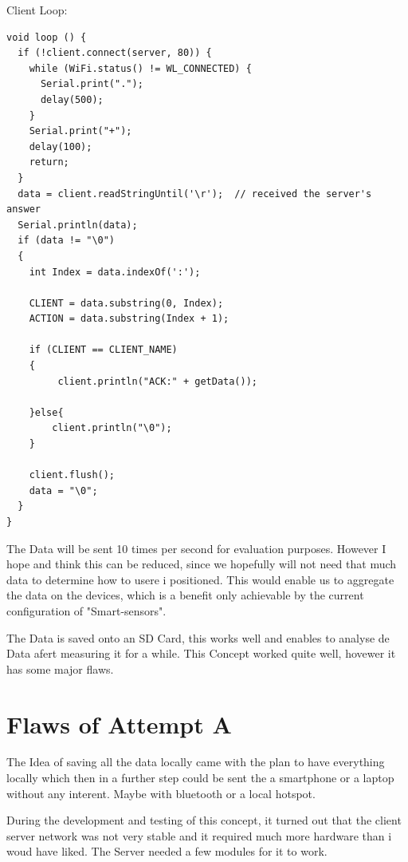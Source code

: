 Client Loop:

\begin{lstlisting}
void loop () {
  if (!client.connect(server, 80)) {
    while (WiFi.status() != WL_CONNECTED) {
      Serial.print(".");
      delay(500);
    }
    Serial.print("+");
    delay(100);
    return;
  }
  data = client.readStringUntil('\r');  // received the server's answer
  Serial.println(data);
  if (data != "\0")
  {
    int Index = data.indexOf(':');

    CLIENT = data.substring(0, Index);
    ACTION = data.substring(Index + 1);

    if (CLIENT == CLIENT_NAME)
    {
         client.println("ACK:" + getData());
      
    }else{
        client.println("\0");
    }

    client.flush();
    data = "\0";
  }
}
\end{lstlisting}

The Data will be sent 10 times per second for evaluation purposes. 
However I hope and think this can be reduced, since we hopefully will not need that much data to determine how to usere i positioned. This would enable us to aggregate the data on the devices, which is a benefit only achievable by the current configuration of "Smart-sensors".

The Data is saved onto an SD Card, this works well and enables to analyse de Data afert measuring it for a while. This Concept worked quite well, hovewer it has some major flaws. 

\section{Flaws of Attempt A}

The Idea of saving all the data locally came with the plan to have everything locally which then in a further step could be sent the a smartphone or a laptop without any interent. Maybe with bluetooth or a local hotspot. 

During the development and testing of this concept, it turned out that the client server network was not very stable and it required much more hardware than i woud have liked. 
The Server needed a few modules for it to work.

